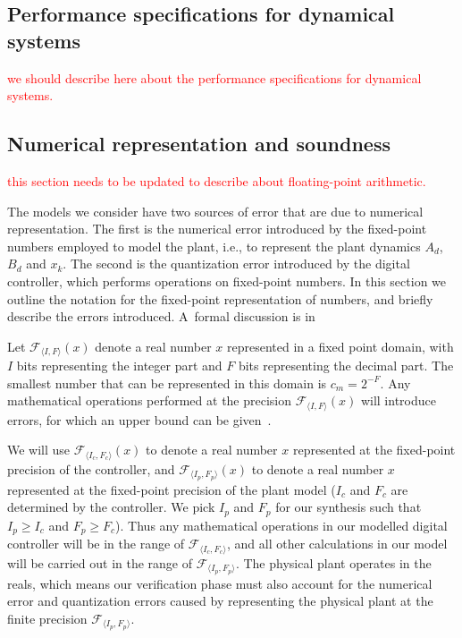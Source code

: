 \documentclass[twocolumn]{autart}    %
\begin{document}
\subsection{Performance specifications for dynamical systems}
\label{ssec:performance}

\textcolor{red}{we should describe here about the performance specifications for dynamical systems.}

\subsection{Numerical representation and soundness} 
\label{sec:numeric_rep}

\textcolor{red}{this section needs to be updated to describe about floating-point arithmetic.}

The models we consider have two sources of error that are due to numerical  
representation.  The first is the numerical error introduced by the
fixed-point numbers employed to model the plant, i.e., to represent the
plant dynamics $A_d$, $B_d$ and $x_k$.  The second is the quantization error
introduced by the digital controller, which performs operations on
fixed-point numbers.  In this section we outline the notation for the
fixed-point representation of numbers, and briefly describe the errors
introduced.  A~formal discussion is in

Let $\mathcal{F}_{\langle I,F \rangle}(x)$ denote a real number $x$
represented in a fixed point domain, with $I$ bits representing the integer
part and $F$ bits representing the decimal part.  The smallest number that
can be represented in this domain is $c_m=2^{-F}$.  Any mathematical
operations performed at the precision $\mathcal{F}_{\langle I,F \rangle}(x)$
will introduce errors, for which an upper bound can be
given~\cite{DBLP:conf/arith/BrainTRW15}.

We will use $\mathcal{F}_{\langle I_c,F_c \rangle}(x)$ to denote a real
number $x$ represented at the fixed-point precision of the controller, and
$\mathcal{F}_{\langle I_p,F_p \rangle}(x)$ to denote a real number $x$
represented at the fixed-point precision of the plant model ($I_c$ and $F_c$ are determined by the controller. We pick $I_p$ and $F_p$ for our synthesis such that $I_p \geq I_c$ and $\allowbreak F_p \geq F_c$).  Thus any mathematical operations in our modelled
digital controller will be in the range of $\mathcal{F}_{\langle I_c,F_c
\rangle}$, and all other calculations in our model will be carried out in the range of
$\mathcal{F}_{\langle I_p,F_p \rangle}$.  
The physical plant operates in the
reals, which means our verification phase must also account for the numerical error and quantization errors caused by representing the physical plant at the finite precision $\mathcal{F}_{\langle I_p,F_p \rangle}$.
\end{document}
